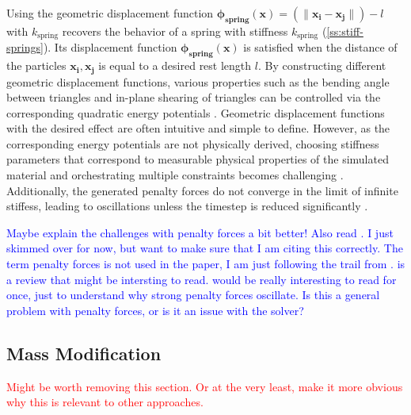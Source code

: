 Using the geometric displacement function $\bm{\phi_{\text{spring}}(x)} = (\lVert \bm{x_i} - \bm{x_j} \rVert) - l$ with $k_{\text{spring}}$ 
recovers the behavior of a spring with stiffness $k_{\text{spring}}$ (\cref{ss:stiff-springs}). Its displacement function 
$\bm{\phi_{\text{spring}}(x)}$ is satisfied when the distance of the particles $\bm{x_i}, \bm{x_j}$ is equal to a desired rest length $l$. 
By constructing different geometric displacement functions, various properties such as the bending angle between triangles and in-plane 
shearing of triangles can be controlled via the corresponding quadratic energy potentials \cite{baraff1998}. Geometric displacement 
functions with the desired effect are often intuitive and simple to define. However, as the corresponding energy potentials are not physically 
derived, choosing stiffness parameters that correspond to measurable physical properties of the simulated material and orchestrating 
multiple constraints becomes challenging \cite{servin2006, nealen2006}. Additionally, the generated penalty forces do not converge in the 
limit of infinite stiffess, leading to oscillations unless the timestep is reduced significantly \cite{rubin1957}.

\textcolor{blue}{Maybe explain the challenges with penalty forces a bit better! Also read \cite{terz1987, nealen2006, rubin1957}. 
I just skimmed over \cite{terz1987} for now, but want to make sure that I am citing this correctly. The term penalty forces is not used
in the paper, I am just following the trail from \cite{servin2006}. \cite{nealen2006} is a review that might be intersting to read.
\cite{rubin1957} would be really interesting to read for once, just to understand why strong penalty forces oscillate. Is this a
general problem with penalty forces, or is it an issue with the solver?}

\subsection{Mass Modification}\label{ss:mass-modification}
\textcolor{red}{Might be worth removing this section. Or at the very least, make it more obvious why this is relevant to other 
approaches.}

